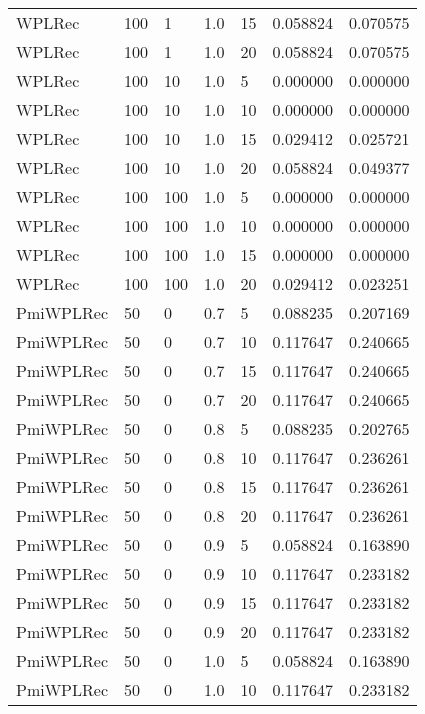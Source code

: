 \begin{tabular}{lllrlrr}
    WPLRec &  100 &     1 &   1.0 &   15 &     0.058824 &  0.070575 \\
    WPLRec &  100 &     1 &   1.0 &   20 &     0.058824 &  0.070575 \\
    WPLRec &  100 &    10 &   1.0 &    5 &     0.000000 &  0.000000 \\
    WPLRec &  100 &    10 &   1.0 &   10 &     0.000000 &  0.000000 \\
    WPLRec &  100 &    10 &   1.0 &   15 &     0.029412 &  0.025721 \\
    WPLRec &  100 &    10 &   1.0 &   20 &     0.058824 &  0.049377 \\
    WPLRec &  100 &   100 &   1.0 &    5 &     0.000000 &  0.000000 \\
    WPLRec &  100 &   100 &   1.0 &   10 &     0.000000 &  0.000000 \\
    WPLRec &  100 &   100 &   1.0 &   15 &     0.000000 &  0.000000 \\
    WPLRec &  100 &   100 &   1.0 &   20 &     0.029412 &  0.023251 \\
 PmiWPLRec &   50 &     0 &   0.7 &    5 &     0.088235 &  0.207169 \\
 PmiWPLRec &   50 &     0 &   0.7 &   10 &     0.117647 &  0.240665 \\
 PmiWPLRec &   50 &     0 &   0.7 &   15 &     0.117647 &  0.240665 \\
 PmiWPLRec &   50 &     0 &   0.7 &   20 &     0.117647 &  0.240665 \\
 PmiWPLRec &   50 &     0 &   0.8 &    5 &     0.088235 &  0.202765 \\
 PmiWPLRec &   50 &     0 &   0.8 &   10 &     0.117647 &  0.236261 \\
 PmiWPLRec &   50 &     0 &   0.8 &   15 &     0.117647 &  0.236261 \\
 PmiWPLRec &   50 &     0 &   0.8 &   20 &     0.117647 &  0.236261 \\
 PmiWPLRec &   50 &     0 &   0.9 &    5 &     0.058824 &  0.163890 \\
 PmiWPLRec &   50 &     0 &   0.9 &   10 &     0.117647 &  0.233182 \\
 PmiWPLRec &   50 &     0 &   0.9 &   15 &     0.117647 &  0.233182 \\
 PmiWPLRec &   50 &     0 &   0.9 &   20 &     0.117647 &  0.233182 \\
 PmiWPLRec &   50 &     0 &   1.0 &    5 &     0.058824 &  0.163890 \\
 PmiWPLRec &   50 &     0 &   1.0 &   10 &     0.117647 &  0.233182 \\

\end{tabular}

